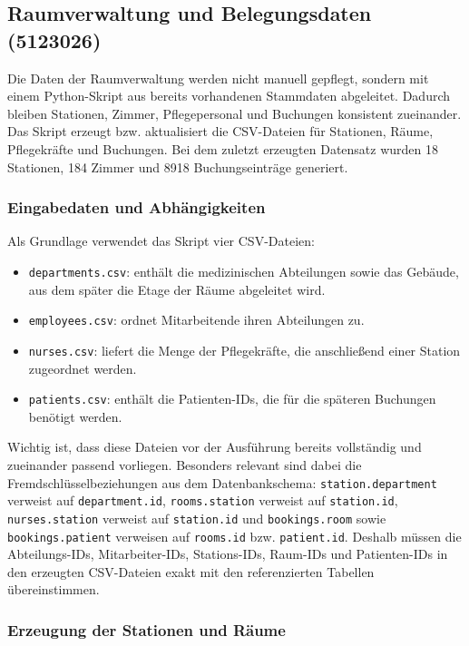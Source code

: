 \subsection{Raumverwaltung und Belegungsdaten (5123026)}

Die Daten der Raumverwaltung werden nicht manuell gepflegt, sondern mit einem Python-Skript aus
bereits vorhandenen Stammdaten abgeleitet. Dadurch bleiben Stationen, Zimmer, Pflegepersonal und
Buchungen konsistent zueinander. Das Skript erzeugt bzw. aktualisiert die CSV-Dateien für
Stationen, Räume, Pflegekräfte und Buchungen. Bei dem zuletzt erzeugten Datensatz wurden
18 Stationen, 184 Zimmer und 8918 Buchungseinträge generiert.

\subsubsection*{Eingabedaten und Abhängigkeiten}

Als Grundlage verwendet das Skript vier CSV-Dateien:

\begin{itemize}
    \item \texttt{departments.csv}: enthält die medizinischen Abteilungen sowie das Gebäude, aus dem später die Etage der Räume abgeleitet wird.
    \item \texttt{employees.csv}: ordnet Mitarbeitende ihren Abteilungen zu.
    \item \texttt{nurses.csv}: liefert die Menge der Pflegekräfte, die anschließend einer Station zugeordnet werden.
    \item \texttt{patients.csv}: enthält die Patienten-IDs, die für die späteren Buchungen benötigt werden.
\end{itemize}

Wichtig ist, dass diese Dateien vor der Ausführung bereits vollständig und zueinander passend
vorliegen. Besonders relevant sind dabei die Fremdschlüsselbeziehungen aus dem Datenbankschema:
\texttt{station.department} verweist auf \texttt{department.id}, \texttt{rooms.station} verweist
auf \texttt{station.id}, \texttt{nurses.station} verweist auf \texttt{station.id} und
\texttt{bookings.room} sowie \texttt{bookings.patient} verweisen auf \texttt{rooms.id} bzw.
\texttt{patient.id}. Deshalb müssen die Abteilungs-IDs, Mitarbeiter-IDs, Stations-IDs, Raum-IDs
und Patienten-IDs in den erzeugten CSV-Dateien exakt mit den referenzierten Tabellen übereinstimmen.

\subsubsection*{Erzeugung der Stationen und Räume}

